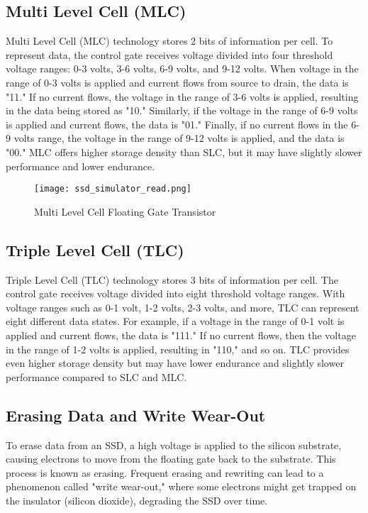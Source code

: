 \documentclass[conference]{IEEEtran}
\begin{document}
\subsection{Multi Level Cell (MLC)}
Multi Level Cell (MLC) technology stores 2 bits of information per cell. To represent data, the control gate receives voltage divided into four threshold voltage ranges: 0-3 volts, 3-6 volts, 6-9 volts, and 9-12 volts. When voltage in the range of 0-3 volts is applied and current flows from source to drain, the data is "11." If no current flows, the voltage in the range of 3-6 volts is applied, resulting in the data being stored as "10." Similarly, if the voltage in the range of 6-9 volts is applied and current flows, the data is "01." Finally, if no current flows in the 6-9 volts range, the voltage in the range of 9-12 volts is applied, and the data is "00." MLC offers higher storage density than SLC, but it may have slightly slower performance and lower endurance.
\begin{figure}[h]
    \centering
    \texttt{[image: ssd\_simulator\_read.png]}
    \caption{Multi Level Cell Floating Gate Transistor}
    \label{fig:ssd_simulator_read}
\end{figure}
\subsection{Triple Level Cell (TLC)}
Triple Level Cell (TLC) technology stores 3 bits of information per cell. The control gate receives voltage divided into eight threshold voltage ranges. With voltage ranges such as 0-1 volt, 1-2 volts, 2-3 volts, and more, TLC can represent eight different data states. For example, if a voltage in the range of 0-1 volt is applied and current flows, the data is "111." If no current flows, then the voltage in the range of 1-2 volts is applied, resulting in "110," and so on. TLC provides even higher storage density but may have lower endurance and slightly slower performance compared to SLC and MLC.

\subsection{Erasing Data and Write Wear-Out}
To erase data from an SSD, a high voltage is applied to the silicon substrate, causing electrons to move from the floating gate back to the substrate. This process is known as erasing. Frequent erasing and rewriting can lead to a phenomenon called "write wear-out," where some electrons might get trapped on the insulator (silicon dioxide), degrading the SSD over time.
\end{document}
